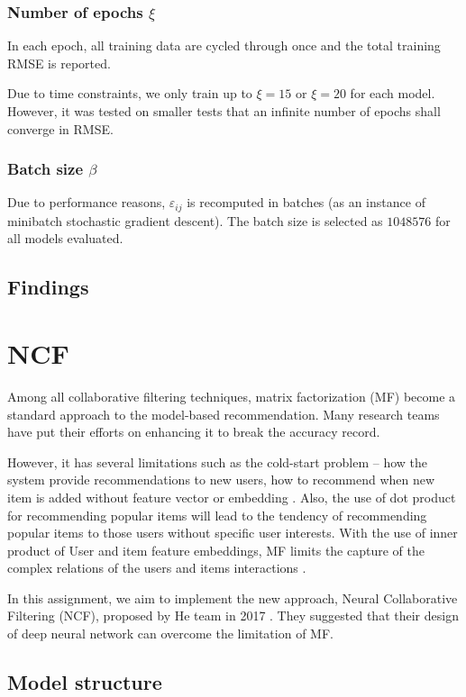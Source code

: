 \documentclass[final]{cvpr}
\begin{document}
\subsubsection{Number of epochs $\xi$}
In each epoch, all training data are cycled through once
and the total training RMSE is reported.

Due to time constraints, we only train up to $\xi=15$ or $\xi=20$ for each model.
However, it was tested on smaller tests that
an infinite number of epochs shall converge in RMSE.

\subsubsection{Batch size $\beta$}
Due to performance reasons, $\varepsilon_{ij}$ is recomputed in batches
(as an instance of minibatch stochastic gradient descent).
The batch size is selected as $1048576$ for all models evaluated.

\subsection{Findings}

\section{\ac{NCF}}

Among all collaborative filtering techniques, matrix factorization (MF) become a standard approach to the model-based recommendation. Many research teams have put their efforts on enhancing it to break the accuracy record. 

However, it has several limitations such as the cold-start problem -- how the system provide recommendations to new users, how to recommend when new item is added without feature vector or embedding \cite{FMF}. Also, the use of dot product for recommending popular items will lead to the tendency of recommending popular items to those users without specific user interests. With the use of inner product of User and item feature embeddings, MF limits the capture of the complex relations  of the users and items interactions \cite{he2017neural}.

In this assignment, we aim to implement the new approach, Neural Collaborative Filtering (NCF), proposed by He team in 2017 \cite{he2017neural}. They suggested that their design of deep neural network can overcome the limitation of MF.

\subsection{Model structure}
\end{document}
